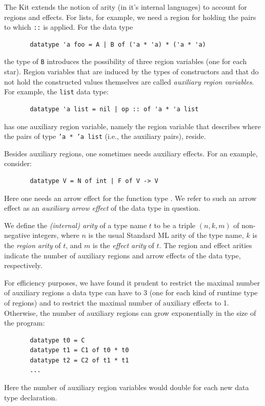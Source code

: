 \documentclass[12pt]{book}
\begin{document}
The Kit extends  the notion of arity  (in it's internal languages)  to account for regions
and effects. For lists, for example, we need a region for holding the pairs to which {\tt ::} is
applied. For the data type
\begin{verbatim}
       datatype 'a foo = A | B of ('a * 'a) * ('a * 'a)
\end{verbatim}
the type of {\tt B} introduces the possibility of three region variables
(one for each star). Region variables that are induced by the types
of constructors and that do not hold the constructed values themselves are called
%
{\em auxiliary region variables}. For example,
the {\tt list} data type:
\begin{verbatim}
       datatype 'a list = nil | op :: of 'a * 'a list
\end{verbatim}
has one auxiliary region variable, namely the region variable that
describes where the pairs of type {\tt 'a * 'a list} (i.e., the auxiliary
pairs), reside.

Besides auxiliary regions, one sometimes needs auxiliary effects.
For an example, consider: 
\begin{verbatim}
       datatype V = N of int | F of V -> V
\end{verbatim}
Here one needs an arrow effect for the function type . We refer
to such an arrow effect as an 
%
{\em auxiliary arrow effect} of the data type in question.


We define the {\em (internal) arity} of a type name $t$ to be a 
triple $(n,k,m)$ of non-negative integers, 
where $n$ is the usual Standard ML arity of the type name,
$k$ is the 
%
{\em region arity} of $t$, and $m$ is the 
%
{\em effect arity} of $t$. The region and effect arities indicate the
number of auxiliary regions and arrow effects of the data type,
respectively.

For efficiency purposes, we have found it prudent to restrict the maximal number
of auxiliary regions a data type can have to 3 
(one for each kind of runtime type of regions) and
to restrict the maximal number of auxiliary effects to 1.               
Otherwise, the number of auxiliary regions can grow exponentially in the
size of the program:
\begin{verbatim}
       datatype t0 = C
       datatype t1 = C1 of t0 * t0
       datatype t2 = C2 of t1 * t1
       ...
\end{verbatim}
Here the number of auxiliary region variables would double for each new data type
declaration. 
\end{document}
